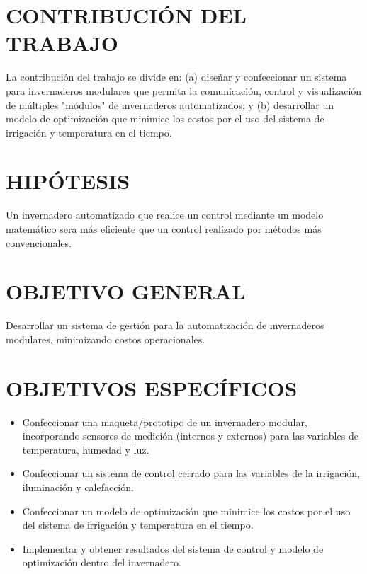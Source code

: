 \documentclass[12pt,a4paper]{article}
\begin{document}
\begin{table}[h!]
\centering
{}
\end{table}


		

		
		
		
	
		

\section{CONTRIBUCIÓN DEL TRABAJO}
	La contribución del trabajo se divide en: (a) diseñar y confeccionar un sistema para invernaderos modulares que permita la comunicación, control y visualización de  múltiples "módulos" de invernaderos automatizados; y (b) desarrollar un modelo de optimización que minimice los costos por el uso del sistema de irrigación y temperatura en el tiempo.
	
\section{HIPÓTESIS}

Un invernadero automatizado que realice un control mediante un modelo matemático sera más eficiente que un control realizado por métodos más convencionales.

\section{OBJETIVO GENERAL}

Desarrollar un sistema de gestión para la automatización de invernaderos modulares, minimizando costos operacionales.

\section{OBJETIVOS ESPECÍFICOS}
	\begin{itemize}
    	\item   Confeccionar una maqueta/prototipo de un invernadero modular, incorporando sensores de medición (internos y externos) para las variables de temperatura, humedad y luz.
    	\item Confeccionar un sistema de control cerrado para las variables de la irrigación, iluminación y calefacción.
        \item 	Confeccionar un modelo de optimización que minimice los costos por el uso del sistema de irrigación y temperatura en el tiempo.
        \item 	Implementar y obtener resultados del sistema de control y modelo de optimización dentro del invernadero.

	\end{itemize}
	
\end{document}
